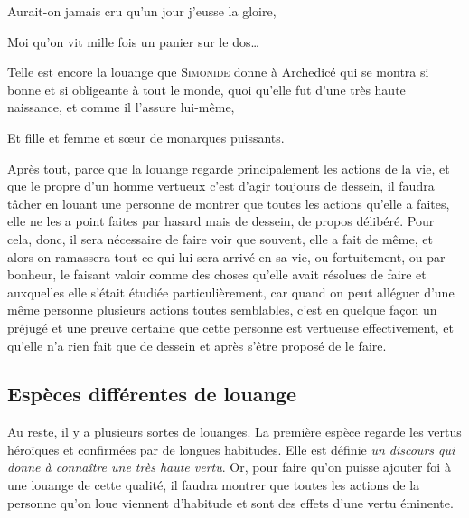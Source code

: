 \begin{emphpar}
	Aurait-on jamais cru qu'un jour j'eusse la gloire,

	Moi qu'on vit mille fois un panier sur le dos\dots
\end{emphpar}

Telle est encore la louange que \textsc{Simonide} donne à Archedicé qui se montra si bonne et si obligeante à tout le monde,
quoi qu'elle fut d'une très haute naissance, et comme il l'assure lui-même, 

\begin{emphpar}
	Et fille et femme et sœur de monarques puissants.
\end{emphpar}

Après tout, parce que la louange regarde principalement les actions de la vie, et que le propre d'un homme vertueux c'est
d'agir toujours de dessein, il faudra tâcher en louant une personne de montrer que toutes les actions qu'elle a faites,
elle ne les a point faites par hasard mais de dessein, de propos délibéré. Pour cela, donc, il sera nécessaire de faire voir
que souvent, elle a fait de même, et alors on ramassera tout ce qui lui sera arrivé en sa vie, ou fortuitement, ou par bonheur,
le faisant valoir comme des choses qu'elle avait résolues de faire et auxquelles elle s'était étudiée particulièrement, car
quand on peut alléguer d'une même personne plusieurs actions toutes semblables, c'est en quelque façon un préjugé et une preuve
certaine que cette personne est vertueuse effectivement, et qu'elle n'a rien fait que de dessein et après s'être proposé de le 
faire.

\subsection{Espèces différentes de louange}

Au reste, il y a plusieurs sortes de louanges. La première espèce regarde les vertus héroïques et confirmées par de
longues habitudes. Elle est définie \emph{un discours qui donne à connaître une très haute vertu}. Or, pour faire qu'on
puisse ajouter foi à une louange de cette qualité, il faudra montrer que toutes les actions de la personne qu'on loue
viennent d'habitude et sont des effets d'une vertu éminente.

\bigbreak

